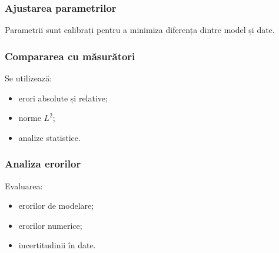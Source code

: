\documentclass[12pt,a4paper]{article}
\begin{document}
\subsubsection*{Ajustarea parametrilor}
Parametrii sunt calibrați pentru a minimiza diferența dintre model și date.

\subsubsection*{Compararea cu măsurători}
Se utilizează:
\begin{itemize}
    \item erori absolute și relative;
    \item norme $L^2$;
    \item analize statistice.
\end{itemize}

\subsubsection*{Analiza erorilor}
Evaluarea:
\begin{itemize}
    \item erorilor de modelare;
    \item erorilor numerice;
    \item incertitudinii în date.
\end{itemize}
\end{document}
